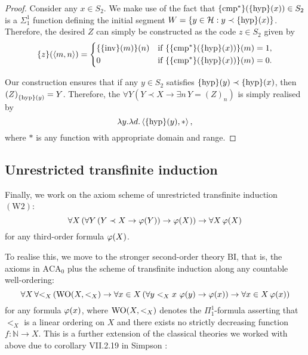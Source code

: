 \documentclass[11pt]{article}
\theoremstyle{plain}
\theoremstyle{definition}
\newcommand{\tuple}[1]{\left\langle #1 \right\rangle}
\DeclareMathOperator{\WO}{WO}
\begin{document}
\begin{proof}
    Consider any $x \in S_2$. We make use of the fact that $\mleft\{\mathrm{cmp}^*\mright\}\mleft(\mleft\{\mathrm{hyp}\mright\}\mleft(x\mright)\mright) \in S_2$ is a $\Sigma^1_1$ function defining the initial segment $W = \left\{y \in \mathcal{H} : y \prec \mleft\{\mathrm{hyp}\mright\}\mleft(x\mright)\right\}$. Therefore, the desired $Z$ can simply be constructed as the code $z \in S_2$ given by
    \[\mleft\{z\mright\}\mleft(\tuple{m, n}\mright) = \left\{\begin{aligned}
             & \mleft\{\mleft\{\mathrm{inv}\mright\}\mleft(m\mright)\mright\}\mleft(n\mright) &  & \text{if} \ \mleft\{\mleft\{\mathrm{cmp}^*\mright\}\mleft(\mleft\{\mathrm{hyp}\mright\}\mleft(x\mright)\mright)\mright\}\mleft(m\mright) = 1, \\
             & 0                                                                              &  & \text{if} \ \mleft\{\mleft\{\mathrm{cmp}^*\mright\}\mleft(\mleft\{\mathrm{hyp}\mright\}\mleft(x\mright)\mright)\mright\}\mleft(m\mright) = 0.
        \end{aligned}\right.\]

    Our construction ensures that if any $y \in S_2$ satisfies $\mleft\{\mathrm{hyp}\mright\}\mleft(y\mright) \prec \mleft\{\mathrm{hyp}\mright\}\mleft(x\mright)$, then $\left(Z\right)_{\mleft\{\mathrm{hyp}\mright\}\mleft(y\mright)} = Y$. Therefore, the $\forall Y \left(Y \prec X \rightarrow \exists n \, Y = \left(Z\right)_n\right)$ is simply realised by
    \[\lambda y. \lambda d. \tuple{\mleft\{\mathrm{hyp}\mright\}\mleft(y\mright), *},\]
    where $*$ is any function with appropriate domain and range.
\end{proof}

\subsection{Unrestricted transfinite induction}
\label{subsec:unrestricted-ti}

Finally, we work on the axiom scheme of unrestricted transfinite induction $\left(\mathrm{W}2\right)$:
\[\forall X \left(\forall Y \left(Y \prec X \rightarrow \varphi\mleft(Y\mright)\right) \rightarrow \varphi\mleft(X\mright)\right) \rightarrow \forall X \, \varphi\mleft(X\mright)\]
for any third-order formula $\varphi\mleft(X\mright)$.

To realise this, we move to the stronger second-order theory $\mathrm{BI}$, that is, the axioms in $\mathrm{ACA}_0$ plus the scheme of transfinite induction along any countable well-ordering:
\[\forall X \, \forall {<_X} \left(\WO\mleft(X, {<_X}\mright) \rightarrow \forall x \in X \left(\forall y <_X x \ \varphi\mleft(y\mright) \rightarrow \varphi\mleft(x\mright)\right) \rightarrow \forall x \in X \, \varphi\mleft(x\mright)\right)\]
for any formula $\varphi\mleft(x\mright)$, where $\WO\mleft(X, {<_X}\mright)$ denotes the $\Pi^1_1$-formula asserting that $<_X$ is a linear ordering on $X$ and there exists no strictly decreasing function $f : \mathbb{N} \rightarrow X$. This is a further extension of the classical theories we worked with above due to corollary VII.2.19 in Simpson \cite{simpson09-soa}:
\end{document}
